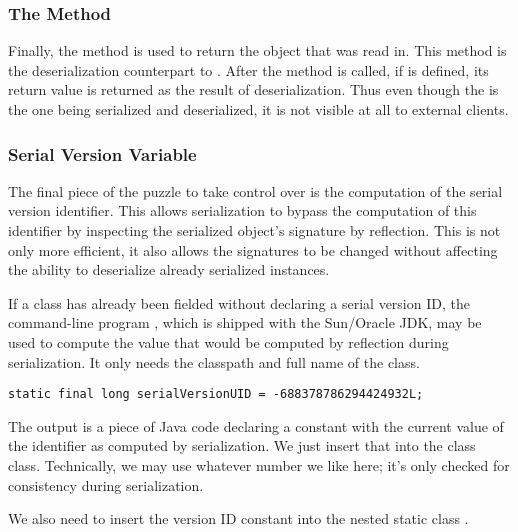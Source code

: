 \subsubsection{The  Method}

Finally, the  method is used to return the object
that was read in.  This method is the deserialization counterpart to
.  After the  method is
called, if  is defined, its return value is
returned as the result of deserialization.  Thus even though
the  is the one being serialized and deserialized,
it is not visible at all to external clients.

\subsubsection{Serial Version Variable}

The final piece of the puzzle to take control over is the computation
of the serial version identifier.  This allows serialization to
bypass the computation of this identifier by inspecting the serialized
object's signature by reflection.  This is not only more efficient,
it also allows the signatures to be changed without affecting
the ability to deserialize already serialized instances.

If a class has already been fielded without declaring a serial version
ID, the command-line program , which is shipped with
the Sun/Oracle JDK, may be used to compute the value that would be
computed by reflection during serialization.  It only needs the
classpath and full name of the class.
%
\begin{verbatim}
static final long serialVersionUID = -688378786294424932L;
\end{verbatim}
%
The output is a piece of Java code declaring a constant
 with the current value of the identifier as
computed by serialization.  We just insert that into the class
 class.  Technically, we may use whatever number
we like here; it's only checked for consistency during serialization.

We also need to insert the version ID constant into the nested static
class .


